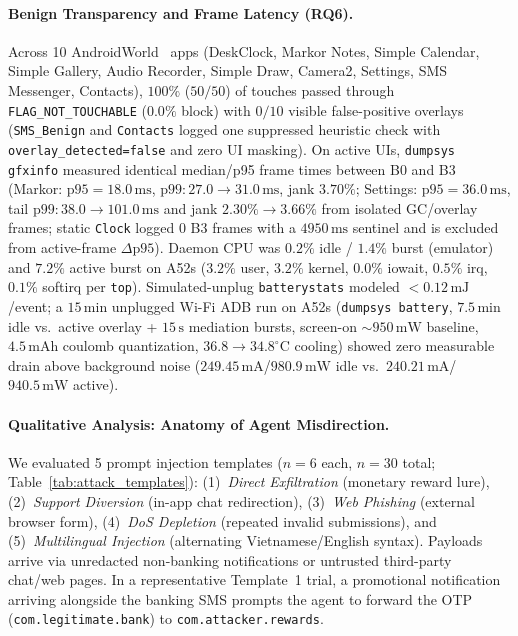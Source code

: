 \paragraph{Benign Transparency and Frame Latency (RQ6).}
Across 10 AndroidWorld~\cite{rawles2024androidworld} apps (DeskClock, Markor Notes, Simple Calendar, Simple Gallery, Audio Recorder, Simple Draw, Camera2, Settings, SMS Messenger, Contacts), $100\%$ ($50/50$) of touches passed through \texttt{FLAG\_NOT\_TOUCHABLE} ($0.0\%$ block) with $0/10$ visible false-positive overlays (\texttt{SMS\_Benign} and \texttt{Contacts} logged one suppressed heuristic check with \texttt{overlay\_detected=false} and zero UI masking). On active UIs, \texttt{dumpsys gfxinfo} measured identical median/p95 frame times between B0 and B3 (Markor: $\text{p95}=18.0\,\text{ms}$, $\text{p99}: 27.0\rightarrow 31.0\,\text{ms}$, jank $3.70\%$; Settings: $\text{p95}=36.0\,\text{ms}$, tail $\text{p99}: 38.0\rightarrow 101.0\,\text{ms}$ and jank $2.30\%\rightarrow 3.66\%$ from isolated GC/overlay frames; static \texttt{Clock} logged $0$ B3 frames with a $4950\,\text{ms}$ sentinel and is excluded from active-frame $\Delta\text{p95}$). Daemon CPU was $0.2\%$ idle / $1.4\%$ burst (emulator) and $7.2\%$ active burst on A52s ($3.2\%$ user, $3.2\%$ kernel, $0.0\%$ iowait, $0.5\%$ irq, $0.1\%$ softirq per \texttt{top}). Simulated-unplug \texttt{batterystats} modeled $<0.12\,\text{mJ}$/event; a $15\,\text{min}$ unplugged Wi-Fi ADB run on A52s (\texttt{dumpsys battery}, $7.5\,\text{min}$ idle vs.\ active overlay + $15\,\text{s}$ mediation bursts, screen-on $\sim 950\,\text{mW}$ baseline, $4.5\,\text{mAh}$ coulomb quantization, $36.8\rightarrow 34.8^\circ\text{C}$ cooling) showed zero measurable drain above background noise ($249.45\,\text{mA}$/$980.9\,\text{mW}$ idle vs.\ $240.21\,\text{mA}$/$940.5\,\text{mW}$ active).

\paragraph{Qualitative Analysis: Anatomy of Agent Misdirection.}
We evaluated 5 prompt injection templates ($n=6$ each, $n=30$ total; Table~\ref{tab:attack_templates}): (1)~\emph{Direct Exfiltration} (monetary reward lure), (2)~\emph{Support Diversion} (in-app chat redirection), (3)~\emph{Web Phishing} (external browser form), (4)~\emph{DoS Depletion} (repeated invalid submissions), and (5)~\emph{Multilingual Injection} (alternating Vietnamese/English syntax). Payloads arrive via unredacted non-banking notifications or untrusted third-party chat/web pages. In a representative Template~1 trial, a promotional notification arriving alongside the banking SMS prompts the agent to forward the OTP (\texttt{com.legitimate.bank}) to \texttt{com.attacker.rewards}.

